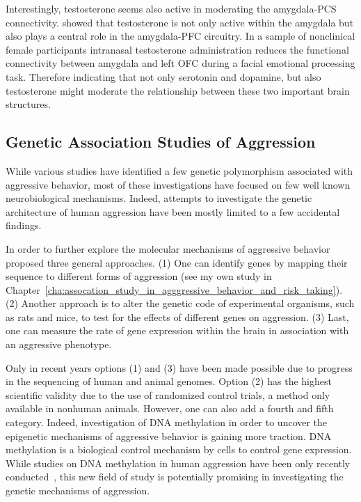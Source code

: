 Interestingly, testosterone seems also active in moderating the amygdala-PCS connectivity.
\citet{VanWingen2010} showed that testosterone is not only active within the amygdala but also plays a central role in the amygdala-PFC circuitry.
In a sample of nonclinical female participants intranasal testosterone administration reduces the functional connectivity between amygdala and left OFC during a facial emotional processing task.
Therefore indicating that not only serotonin and dopamine, but also testosterone might moderate the relationship between these two important brain structures.

\subsection{Genetic Association Studies of Aggression}
\label{sec:genetic_associations}

While various studies have identified a few genetic polymorphism associated with aggressive behavior, most of these investigations have focused on few well known neurobiological mechanisms.
Indeed, attempts to investigate the genetic architecture of human aggression have been mostly limited to a few accidental findings. 

In order to further explore the molecular mechanisms of aggressive behavior~\citet{Maxson2005} proposed three general approaches.
(1) One can identify genes by mapping their sequence to different forms of aggression (see my own study in Chapter~\ref{cha:assocation_study_in_agggressive_behavior_and_risk_taking}).
(2) Another approach is to alter the genetic code of experimental organisms, such as rats and mice, to test for the effects of different genes on aggression.
(3) Last, one can measure the rate of gene expression within the brain in association with an aggressive phenotype.

Only in recent years options (1) and (3) have been made possible due to progress in the sequencing of human and animal genomes.
Option (2) has the highest scientific validity due to the use of randomized control trials, a method only available in nonhuman animals.
However, one can also add a fourth and fifth category.
Indeed, investigation of DNA methylation in order to uncover the epigenetic mechanisms of aggressive behavior is gaining more traction.
DNA methylation is a biological control mechanism by cells to control gene expression.
While studies on DNA methylation in human aggression have been only recently  conducted~\cite{VanDongen2015a}, this new field of study is potentially promising in investigating the genetic mechanisms of aggression.

